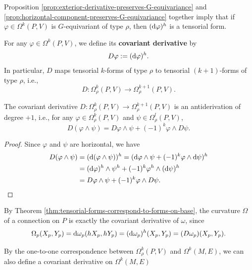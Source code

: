 Proposition \ref{prop:exterior-derivative-preserves-G-equivariance} and \ref{prop:horizontal-component-preserves-G-equivariance} 
together imply that if $\varphi\in\Omega^k(P, V)$ is $G$-equivariant of type $\rho$, then $({\rm d}\varphi)^h$ is a tensorial form.
\begin{definition}
    For any $\varphi\in\Omega^k(P, V)$, we define its \textbf{covariant derivative} by 
    \begin{equation*}
        D\varphi := ({\rm d}\varphi)^h.
    \end{equation*}
    In particular, $D$ maps tensorial $k$-forms of type $\rho$ to tensorial $(k+1)$-forms of type $\rho$, i.e., 
    \begin{equation*}
        D: \Omega^k_{\rho}(P, V) \to \Omega^{k+1}_{\rho}(P, V).
    \end{equation*}
\end{definition}
\begin{proposition}
    The covariant derivative $D: \Omega^k_{\rho}(P, V) \to \Omega^{k+1}_{\rho}(P, V)$ is an antiderivation of degree $+1$, 
    i.e., for any $\varphi\in\Omega^k_{\rho}(P, V)$ and $\psi\in\Omega^l_{\rho}(P, V)$,
    \begin{equation*}
        D(\varphi\wedge\psi) = D\varphi\wedge\psi + (-1)^k\varphi\wedge D\psi.
    \end{equation*}
\end{proposition}
\begin{proof}
    Since $\varphi$ and $\psi$ are horizontal, we have 
    \begin{align*}
        D(\varphi\wedge\psi) &= ({\rm d}(\varphi\wedge\psi))^h = ({\rm d}\varphi\wedge\psi + (-1)^k\varphi\wedge {\rm d}\psi)^h  \\ 
        &= ({\rm d}\varphi)^h\wedge\psi^h + (-1)^k\varphi^h\wedge ({\rm d}\psi)^h \\ 
        &= D\varphi\wedge\psi + (-1)^k\varphi\wedge D\psi. \qedhere
    \end{align*}
\end{proof}
\begin{example}
    By Theorem \ref{thm:tensorial-forms-correspond-to-forms-on-base}, 
    the curvature $\Omega$ of a connection on $P$ is exactly the covariant derivative of $\omega$, since
    \begin{equation*}
        \Omega_p(X_p, Y_p) = {\rm d}\omega_p(hX_p, hY_p) = ({\rm d}\omega_p)^h(X_p, Y_p) = (D\omega_p)(X_p, Y_p). 
    \end{equation*}
\end{example}
By the one-to-one correspondence between $\Omega^k_{\rho}(P, V)$ and $\Omega^k(M, E)$, we can also define a covariant derivative on $\Omega^k(M, E)$ 

